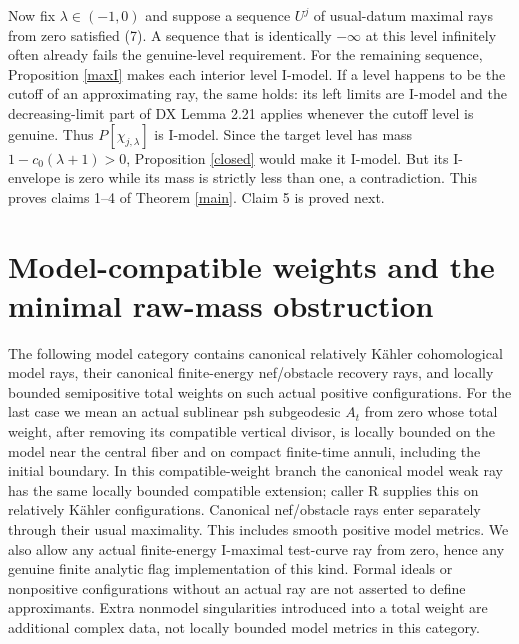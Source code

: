 \documentclass[11pt]{article}
\begin{document}
Now fix $\lambda\in(-1,0)$ and suppose a sequence $U^j$ of
usual-datum maximal rays from zero satisfied (7). A sequence that
is identically $-\infty$ at this level infinitely often already
fails the genuine-level requirement. For the remaining sequence,
Proposition \ref{maxI} makes each interior level I-model. If a
level happens to be the cutoff of an approximating ray, the same
holds: its left limits are I-model and the decreasing-limit
part of DX Lemma 2.21 applies whenever the cutoff level is
genuine. Thus $P[\chi_{j,\lambda}]$ is I-model.
Since the target level has mass $1-c_0(\lambda+1)>0$,
Proposition \ref{closed} would make it I-model. But its
I-envelope is zero while its mass is strictly less than one,
a contradiction. This proves claims 1--4 of Theorem \ref{main}. Claim 5 is proved next.

\section{Model-compatible weights and the minimal raw-mass obstruction}\label{minimal}
The following model category contains canonical relatively K\"ahler
cohomological model rays, their canonical finite-energy nef/obstacle
recovery rays, and locally bounded semipositive total weights on such
actual positive configurations. For the last case we mean an actual
sublinear psh subgeodesic $A_t$ from zero whose total weight, after
removing its compatible vertical divisor, is locally bounded on the
model near the central fiber and on compact finite-time annuli, including
the initial boundary. In this compatible-weight branch the canonical
model weak ray has the same locally bounded compatible extension;
caller R supplies this on relatively K\"ahler configurations. Canonical
nef/obstacle rays enter separately through their usual maximality.
This includes smooth positive model metrics.
We also allow any actual finite-energy I-maximal test-curve ray from
zero, hence any genuine finite analytic flag implementation of this
kind. Formal ideals or nonpositive configurations without an actual ray
are not asserted to define approximants. Extra nonmodel singularities
introduced into a total weight are additional complex data, not locally
bounded model metrics in this category.
\end{document}
